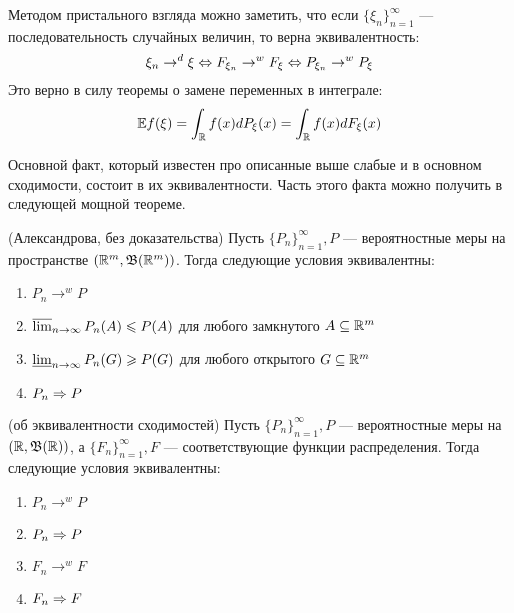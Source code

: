\begin{note}
	Методом пристального взгляда можно заметить, что если $\{\xi_n\}_{n = 1}^\infty$ --- последовательность случайных величин, то верна эквивалентность:
	\[
		\xi_n \to^d \xi \Lra F_{\xi_n} \to^w F_\xi \Lra P_{\xi_n} \to^w P_\xi
	\]
	Это верно в силу теоремы о замене переменных в интеграле:
	\[
		\E f(\xi) = \int_\R f(x)dP_\xi(x) = \int_\R f(x)dF_\xi(x)
	\]
\end{note}

\begin{note}
	Основной факт, который известен про описанные выше слабые и в основном сходимости, состоит в их эквивалентности. Часть этого факта можно получить в следующей мощной теореме.
\end{note}

\begin{theorem} (Александрова, без доказательства)
	Пусть $\{P_n\}_{n = 1}^\infty, P$ --- вероятностные меры на пространстве $(\R^m, \B(\R^m))$. Тогда следующие условия эквивалентны:
	\begin{enumerate}
		\item $P_n \to^w P$
		
		\item $\varlimsup_{n \to \infty} P_n(A) \le P(A)$ для любого замкнутого $A \subseteq \R^m$
		
		\item $\varliminf_{n \to \infty} P_n(G) \ge P(G)$ для любого открытого $G \subseteq \R^m$
		
		\item $P_n \Ra P$
	\end{enumerate}
\end{theorem}

\begin{theorem} (об эквивалентности сходимостей)
	Пусть $\{P_n\}_{n = 1}^\infty, P$ --- вероятностные меры на $(\R, \B(\R))$, а $\{F_n\}_{n = 1}^\infty, F$ --- соответствующие функции распределения. Тогда следующие условия эквивалентны:
	\begin{enumerate}
		\item $P_n \to^w P$
		
		\item $P_n \Ra P$
		
		\item $F_n \to^w F$
		
		\item $F_n \Ra F$
	\end{enumerate}
\end{theorem}

